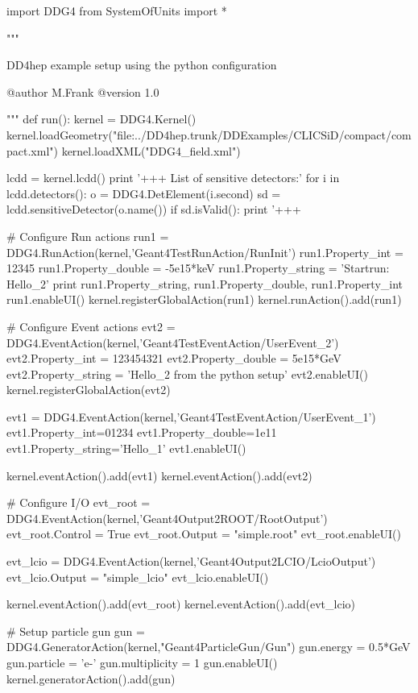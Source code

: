\documentclass[10pt,a4paper]{article}
\begin{document}
\begin{code}
import DDG4
from SystemOfUnits import *

"""

   DD4hep example setup using the python configuration

   @author  M.Frank
   @version 1.0

"""
def run():
  kernel = DDG4.Kernel()
  kernel.loadGeometry("file:../DD4hep.trunk/DDExamples/CLICSiD/compact/compact.xml")
  kernel.loadXML("DDG4_field.xml")

  lcdd = kernel.lcdd()
  print '+++   List of sensitive detectors:'
  for i in lcdd.detectors(): 
    o = DDG4.DetElement(i.second)
    sd = lcdd.sensitiveDetector(o.name())
    if sd.isValid():
      print '+++  %

  # Configure Run actions
  run1 = DDG4.RunAction(kernel,'Geant4TestRunAction/RunInit')
  run1.Property_int    = 12345
  run1.Property_double = -5e15*keV
  run1.Property_string = 'Startrun: Hello_2'
  print run1.Property_string, run1.Property_double, run1.Property_int
  run1.enableUI()
  kernel.registerGlobalAction(run1)
  kernel.runAction().add(run1)

  # Configure Event actions
  evt2 = DDG4.EventAction(kernel,'Geant4TestEventAction/UserEvent_2')
  evt2.Property_int    = 123454321
  evt2.Property_double = 5e15*GeV
  evt2.Property_string = 'Hello_2 from the python setup'
  evt2.enableUI()
  kernel.registerGlobalAction(evt2)

  evt1 = DDG4.EventAction(kernel,'Geant4TestEventAction/UserEvent_1')
  evt1.Property_int=01234
  evt1.Property_double=1e11
  evt1.Property_string='Hello_1'
  evt1.enableUI()

  kernel.eventAction().add(evt1)
  kernel.eventAction().add(evt2)

  # Configure I/O
  evt_root = DDG4.EventAction(kernel,'Geant4Output2ROOT/RootOutput')
  evt_root.Control = True
  evt_root.Output = "simple.root"
  evt_root.enableUI()

  evt_lcio = DDG4.EventAction(kernel,'Geant4Output2LCIO/LcioOutput')
  evt_lcio.Output = "simple_lcio"
  evt_lcio.enableUI()

  kernel.eventAction().add(evt_root)
  kernel.eventAction().add(evt_lcio)

  # Setup particle gun
  gun = DDG4.GeneratorAction(kernel,"Geant4ParticleGun/Gun")
  gun.energy   = 0.5*GeV
  gun.particle = 'e-'
  gun.multiplicity = 1
  gun.enableUI()
  kernel.generatorAction().add(gun)


\end{code}
\end{document}
